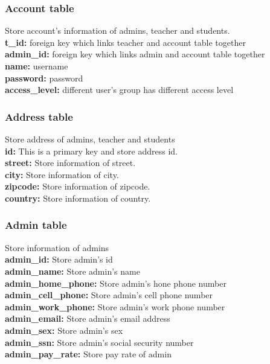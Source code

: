 \subsubsection{Account table}
Store account's information of admins, teacher and students.\\
\textbf{t\_id:} foreign key which links teacher and account table together\\
\textbf{admin\_id:} foreign key which links admin and account table together\\
\textbf{name:} username\\
\textbf{password:} password\\
\textbf{access\_level:} different user's group has different access level

\subsubsection{Address table}
Store address of admins, teacher and students\\
\textbf{id:} This is a primary key and store address id.\\
\textbf{street:} Store information of street.\\
\textbf{city:} Store information of city.\\
\textbf{zipcode:} Store information of zipcode.\\
\textbf{country:} Store information of country.\\


\subsubsection{Admin table}
Store information of admins\\
\textbf{admin\_id:} Store admin's id\\
\textbf{admin\_name:} Store admin's name\\
\textbf{admin\_home\_phone:} Store admin's hone phone number\\
\textbf{admin\_cell\_phone:} Store admin's cell phone number\\
\textbf{admin\_work\_phone:} Store admin's work phone number\\
\textbf{admin\_email:} Store admin's email address\\
\textbf{admin\_sex:} Store admin's sex\\
\textbf{admin\_ssn:} Store admin's social security number\\
\textbf{admin\_pay\_rate:} Store pay rate of admin

